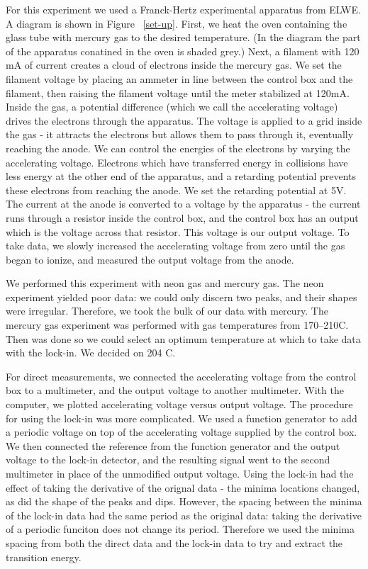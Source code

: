 \documentclass[prb,preprint]{revtex4-1}
\begin{document}
For this experiment we used a Franck-Hertz experimental apparatus from ELWE. A diagram is shown in Figure ~\ref{set-up}. 
First, we heat the oven containing the glass tube with mercury gas to the desired temperature. 
(In the diagram the part of the apparatus conatined in the oven is shaded grey.) 
Next, a filament with 120 mA of current creates a cloud of electrons inside the mercury gas. 
We set the filament voltage by placing an ammeter in line between the control box and the filament, then raising the filament voltage until the meter stabilized at 120mA. 
Inside the gas, a potential difference (which we call the accelerating voltage) drives the electrons through the apparatus. 
The voltage is applied to a grid inside the gas - it attracts the electrons but allows them to pass through it, eventually reaching the anode. 
We can control the energies of the electrons by varying the accelerating voltage. 
Electrons which have transferred energy in collisions have less energy at the other end of the apparatus, and a retarding potential prevents these electrons from reaching the anode. 
We set the retarding potential at 5V. %
The current at the anode is converted to a voltage by the apparatus - the current runs through a resistor inside the control box, and the control box has an output which is the voltage across that resistor. 
This voltage is our output voltage. 
To take data, we slowly increased the accelerating voltage from zero until the gas began to ionize, and measured the output voltage from the anode. 

We performed this experiment with neon gas and mercury gas. 
The neon experiment yielded poor data: we could only discern two peaks, and their shapes were irregular. 
Therefore, we took the bulk of our data with mercury. 
The mercury gas experiment was performed with gas temperatures from 170\degree--210\degree C. 
Then was done so we could select an optimum temperature at which to take data with the lock-in. 
We decided on 204 \degree C. 

For direct measurements, we connected the accelerating voltage from the control box to a multimeter, and the output voltage to another multimeter. 
With the computer, we plotted accelerating voltage versus output voltage. 
The procedure for using the lock-in was more complicated. 
We used a function generator to add a periodic voltage on top of the accelerating voltage supplied by the control box. 
We then connected the reference from the function generator and the output voltage to the lock-in detector, and the resulting signal went to the second multimeter in place of the unmodified output voltage. 
Using the lock-in had the effect of taking the derivative of the orignal data - the minima locations changed, as did the shape of the peaks and dips. 
However, the spacing between the minima of the lock-in data had the same period as the original data: taking the derivative of a periodic funciton does not change its period. 
Therefore we used the minima spacing from both the direct data and the lock-in data to try and extract the transition energy. 
\end{document}
